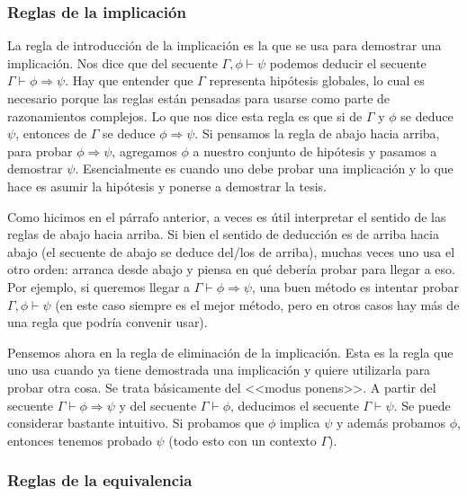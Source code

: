 \documentclass[a4paper, 12pt]{report}
\newcommand{\Ra}{\Rightarrow}
\theoremstyle{definition}
\begin{document}
\subsubsection{Reglas de la implicación}

La regla de introducción de la implicación es la que se usa para demostrar una implicación. Nos dice que del secuente $\Gamma,\phi\vdash\psi$ podemos deducir el secuente $\Gamma\vdash\phi\Ra\psi$. Hay que entender que $\Gamma$ representa hipótesis globales, lo cual es necesario porque las reglas están pensadas para usarse como parte de razonamientos complejos. Lo que nos dice esta regla es que si de $\Gamma$ y $\phi$ se deduce $\psi$, entonces de $\Gamma$ se deduce $\phi\Ra\psi$. Si pensamos la regla de abajo hacia arriba, para probar $\phi\Ra\psi$, agregamos $\phi$ a nuestro conjunto de hipótesis y pasamos a demostrar $\psi$. Esencialmente es cuando uno debe probar una implicación y lo que hace es asumir la hipótesis y ponerse a demostrar la tesis.

Como hicimos en el párrafo anterior, a veces es útil interpretar el sentido de las reglas de abajo hacia arriba. Si bien el sentido de deducción es de arriba hacia abajo (el secuente de abajo se deduce del/los de arriba), muchas veces uno usa el otro orden: arranca desde abajo y piensa en qué debería probar para llegar a eso. Por ejemplo, si queremos llegar a $\Gamma\vdash\phi\Ra\psi$, una buen método es intentar probar $\Gamma,\phi\vdash\psi$ (en este caso siempre es el mejor método, pero en otros casos hay más de una regla que podría convenir usar).

Pensemos ahora en la regla de eliminación de la implicación. Esta es la regla que uno usa cuando ya tiene demostrada una implicación y quiere utilizarla para probar otra cosa. Se trata básicamente del <<modus ponens>>. A partir del secuente $\Gamma\vdash\phi\Ra\psi$ y del secuente $\Gamma\vdash\phi$, deducimos el secuente $\Gamma\vdash\psi$. Se puede considerar bastante intuitivo. Si probamos que $\phi$ implica $\psi$ y además probamos $\phi$, entonces tenemos probado $\psi$ (todo esto con un contexto $\Gamma$).

\subsubsection{Reglas de la equivalencia}
\end{document}
